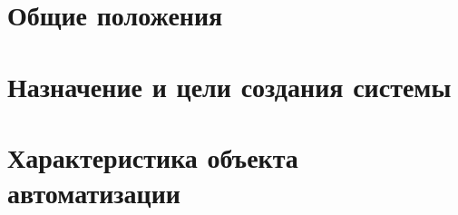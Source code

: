 
\def \notincludehead{}






 	\maketitle
 	
   
% 	

	\scriptsize
	\setcounter{tocdepth}{4}
	\tableofcontents
	\normalsize
	\newpage




\newcommand{\gofro}   {\blue{@ГТ}\xspace}
\newcommand{\erp}     {\blue{@1С:УПП}\xspace}
\newcommand{\buh}     {\blue{@1C:Бухгалтерия}\xspace}
\newcommand{\syncro}  {\blue{@SYNCRO}\xspace}


\newcommand{\manager}{!МенеджерПоПродажам}
\newcommand{\tehnolog}{!Технолог}
\newcommand{\planner}{!Планировщик}
\newcommand{\operator}{!МашинистЛинии}
\newcommand{\linkoperator}{!ОператорРаската}
\newcommand{\processengineer}{!ДиректорПоПроизводству}
\newcommand{\auditor}{!Бухгалтер}
\newcommand{\gaoperator}{!МашинистГА}
\newcommand{\master}{!МастерСмены}
\newcommand{\director}{!Директор}
\newcommand{\laborant}{!КонтролерПоКачеству}
    


	\section{Общие положения}
	

	\section{Назначение и цели создания системы}
	

	\section{Характеристика объекта автоматизации}
	

    


